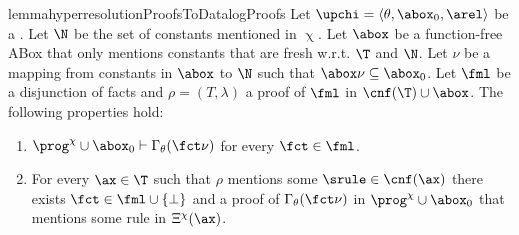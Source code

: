 \begin{restatable}{lemma}{hyperresolutionProofsToDatalogProofs}
\label{lemma:HyperresolutionProofsToDatalogProofs}
Let $\upchi = \langle \theta, \abox_0, \arel \rangle$ be a \bla{}.
Let $\N$ be the set of constants mentioned in $\upchi$. 
Let $\abox$ be a function-free ABox that only mentions constants that are
fresh w.r.t. $\T$ and $\N$.
Let $\nu$ be a mapping from constants in $\abox$ to $\N$ such that 
$\abox\nu\subseteq \abox_0$.
Let $\fml$ be a disjunction of facts and $\rho = (T, \lambda)$ a proof of 
$\fml$ in $\cnf(\T)\cup\abox$. 
The following properties hold:
\begin{enumerate}
\item $\prog^{\chi}\cup\abox_0 \vdash \Gamma_{\theta}(\fct\nu)$ for every $\fct\in\fml$.
\item For every $\ax\in\T$ such that $\rho$ mentions some $\srule\in \cnf(\ax)$
there exists $\fct\in \fml\cup\{\bot\}$ and a proof of $\Gamma_{\theta}(\fct\nu)$ 
in $\prog^{\chi}\cup\abox_0$ that mentions some rule in $\Xi^{\chi}(\ax)$. 
\end{enumerate}
\end{restatable}
